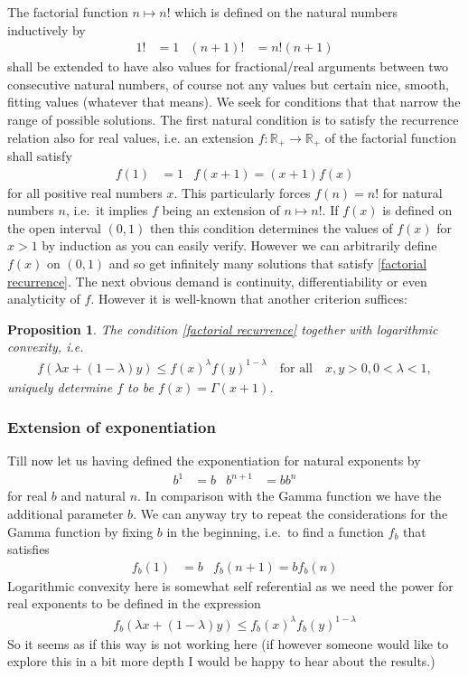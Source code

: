 \documentclass[12pt]{article}
\newtheorem{proposition}{Proposition}
\theoremstyle{definition}
\newcommand{\RP}{\mathbb{R}_+}
\newcommand{\mt}[1]{\quad\mbox{#1}\quad}
\begin{document}
 The factorial function $n\mapsto n!$ which is
defined on the natural numbers inductively by
\begin{align*}
  1!&=1 & (n+1)!&=n!(n+1)
\end{align*}
shall be extended to have also values for fractional/real arguments
between two consecutive natural numbers, of course not any values but
certain nice, smooth, fitting values (whatever that means). We seek for
conditions that that narrow the range of possible solutions. 
The first natural condition is to satisfy the recurrence relation also
for real values, i.e. an extension $f\colon\RP\to\RP$ of the factorial
function shall satisfy
\begin{align}
  f(1)&=1 & f(x+1)=(x+1)f(x)\label{factorial recurrence}
\end{align}
for all positive real numbers $x$. This particularly forces 
$f(n)=n!$ for natural numbers $n$, i.e.\ it implies $f$ being an
extension of $n\mapsto n!$. If $f(x)$ is defined on
the open interval $(0,1)$ then this condition determines the values of
$f(x)$ for $x>1$ by induction as you can easily verify. However we can
arbitrarily define $f(x)$ on $(0,1)$ and so get infinitely many
solutions that satisfy \eqref{factorial recurrence}.
The next obvious demand is continuity, differentiability or even
analyticity of $f$. However it is well-known that another criterion
suffices:
\begin{proposition}
  The condition \eqref{factorial recurrence} together with
  logarithmic convexity, i.e.\ 
  \begin{align*}
    f(\lambda x + (1-\lambda) y)\le f(x)^\lambda
    f(y)^{1-\lambda}\mt{for all}x,y>0,0<\lambda<1,
  \end{align*}
  uniquely determine $f$ to be
  $f(x)=\Gamma(x+1)$. 
\end{proposition}

\subsubsection{Extension of exponentiation}
Till now let us having defined the exponentiation for natural
exponents by
\begin{align*}
  b^1&=b & b^{n+1}&=bb^n
\end{align*}
for real $b$ and natural $n$. 
In comparison with the Gamma function we have
the additional parameter $b$. We can anyway try to repeat the
considerations for the Gamma function by fixing $b$ in the beginning,
i.e.\ to find a function $f_b$ that satisfies
\begin{align}
  f_b(1)&=b & f_b(n+1)=bf_b(n)\label{exponentiation functional recurrence}
\end{align}
Logarithmic convexity here is somewhat self referential as we need the
power for real exponents to be defined in the expression
\begin{align*}
  f_b(\lambda x + (1-\lambda)y)\le f_b(x)^\lambda f_b(y)^{1-\lambda}
\end{align*}
So it seems as if this way is not working here (if however someone
would like to explore this in a bit more depth I would be happy to
hear about the results.)
\end{document}
